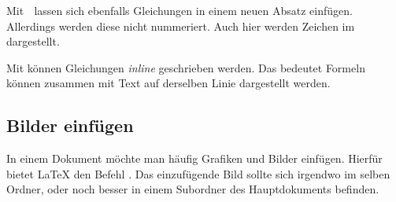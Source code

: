 Mit \befehl{[}$\; $\befehl{]} lassen sich ebenfalls Gleichungen in einem neuen Absatz einfügen. Allerdings werden diese nicht nummeriert. Auch hier werden Zeichen im  dargestellt.

Mit \umgebung{\$ \$} können Gleichungen \textit{inline} geschrieben werden. Das bedeutet Formeln können zusammen mit Text auf derselben Linie dargestellt werden. 
$ $


\subsection{Bilder einfügen}
In einem Dokument möchte man häufig Grafiken und Bilder einfügen. Hierfür bietet \LaTeX{} den Befehl . Das einzufügende Bild sollte sich irgendwo im selben Ordner, oder noch besser in einem Subordner des Hauptdokuments befinden.

